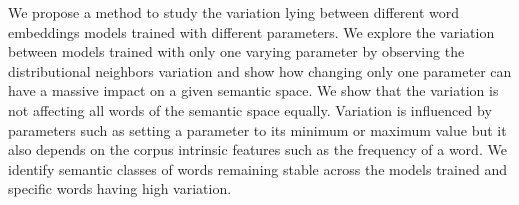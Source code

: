 We propose a method to study the variation lying between different word embeddings models trained with different parameters. We explore the variation between models trained with only one varying parameter by observing the distributional neighbors variation and show how changing only one parameter can have a massive impact on a given semantic space. We show that the variation is not affecting all words of the semantic space equally. Variation is influenced by parameters such as setting a parameter to its minimum or maximum value but it also depends on the corpus intrinsic features such as the frequency of a word. We identify semantic classes of words remaining stable across the models trained and specific words having high variation.
